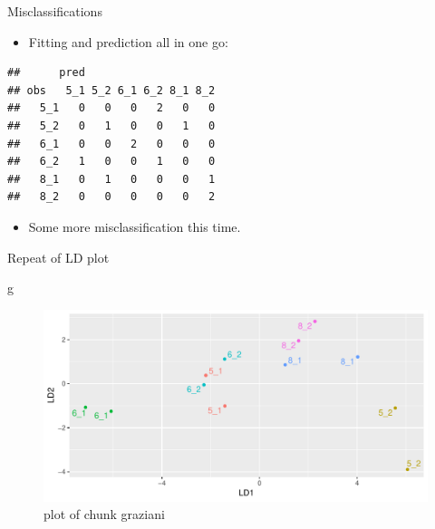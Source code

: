 \documentclass[ignorenonframetext,]{beamer}
\newenvironment{Shaded}{\begin{snugshade}}{\end{snugshade}}
\newcommand{\DataTypeTok}[1]{\textcolor[rgb]{0.13,0.29,0.53}{#1}}
\newcommand{\KeywordTok}[1]{\textcolor[rgb]{0.13,0.29,0.53}{\textbf{#1}}}
\newcommand{\NormalTok}[1]{#1}
\newcommand{\OperatorTok}[1]{\textcolor[rgb]{0.81,0.36,0.00}{\textbf{#1}}}
\newcommand{\StringTok}[1]{\textcolor[rgb]{0.31,0.60,0.02}{#1}}
\providecommand{\tightlist}{%
  \setlength{\itemsep}{0pt}\setlength{\parskip}{0pt}}
\begin{document}
\begin{frame}[fragile]{Misclassifications}
\protect\hypertarget{misclassifications}{}

\begin{itemize}
\tightlist
\item
  Fitting and prediction all in one go:
\end{itemize}

\begin{Shaded}
\end{Shaded}

\begin{verbatim}
##      pred
## obs   5_1 5_2 6_1 6_2 8_1 8_2
##   5_1   0   0   0   2   0   0
##   5_2   0   1   0   0   1   0
##   6_1   0   0   2   0   0   0
##   6_2   1   0   0   1   0   0
##   8_1   0   1   0   0   0   1
##   8_2   0   0   0   0   0   2
\end{verbatim}

\begin{itemize}
\tightlist
\item
  Some more misclassification this time.
\end{itemize}

\end{frame}

\begin{frame}[fragile]{Repeat of LD plot}
\protect\hypertarget{repeat-of-ld-plot}{}

\begin{Shaded}
\begin{Highlighting}[]
\NormalTok{g}
\end{Highlighting}
\end{Shaded}

\begin{figure}
\centering
\includegraphics{figure/graziani-1.pdf}
\caption{plot of chunk graziani}
\end{figure}

\end{frame}
\end{document}
